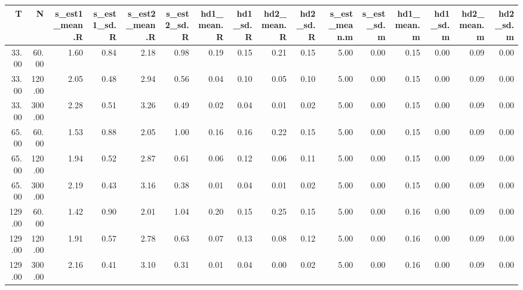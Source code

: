 \begin{table}[ht]
\centering
\begin{tabular}{rrrrrrrrrrrrrrrr}
  \hline
T & N & s\_est1\_mean.R & s\_est1\_sd.R & s\_est2\_mean.R & s\_est2\_sd.R & hd1\_mean.R & hd1\_sd.R & hd2\_mean.R & hd2\_sd.R & s\_est\_mean.m & s\_est\_sd.m & hd1\_mean.m & hd1\_sd.m & hd2\_mean.m & hd2\_sd.m \\ 
  \hline
33.00 & 60.00 & 1.60 & 0.84 & 2.18 & 0.98 & 0.19 & 0.15 & 0.21 & 0.15 & 5.00 & 0.00 & 0.15 & 0.00 & 0.09 & 0.00 \\ 
  33.00 & 120.00 & 2.05 & 0.48 & 2.94 & 0.56 & 0.04 & 0.10 & 0.05 & 0.10 & 5.00 & 0.00 & 0.15 & 0.00 & 0.09 & 0.00 \\ 
  33.00 & 300.00 & 2.28 & 0.51 & 3.26 & 0.49 & 0.02 & 0.04 & 0.01 & 0.02 & 5.00 & 0.00 & 0.15 & 0.00 & 0.09 & 0.00 \\ 
  65.00 & 60.00 & 1.53 & 0.88 & 2.05 & 1.00 & 0.16 & 0.16 & 0.22 & 0.15 & 5.00 & 0.00 & 0.15 & 0.00 & 0.09 & 0.00 \\ 
  65.00 & 120.00 & 1.94 & 0.52 & 2.87 & 0.61 & 0.06 & 0.12 & 0.06 & 0.11 & 5.00 & 0.00 & 0.15 & 0.00 & 0.09 & 0.00 \\ 
  65.00 & 300.00 & 2.19 & 0.43 & 3.16 & 0.38 & 0.01 & 0.04 & 0.01 & 0.02 & 5.00 & 0.00 & 0.15 & 0.00 & 0.09 & 0.00 \\ 
  129.00 & 60.00 & 1.42 & 0.90 & 2.01 & 1.04 & 0.20 & 0.15 & 0.25 & 0.15 & 5.00 & 0.00 & 0.16 & 0.00 & 0.09 & 0.00 \\ 
  129.00 & 120.00 & 1.91 & 0.57 & 2.78 & 0.63 & 0.07 & 0.13 & 0.08 & 0.12 & 5.00 & 0.00 & 0.16 & 0.00 & 0.09 & 0.00 \\ 
  129.00 & 300.00 & 2.16 & 0.41 & 3.10 & 0.31 & 0.01 & 0.04 & 0.00 & 0.02 & 5.00 & 0.00 & 0.16 & 0.00 & 0.09 & 0.00 \\ 
   \hline
\end{tabular}
\end{table}
